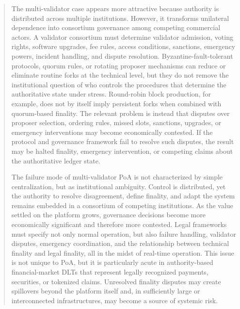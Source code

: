 \documentclass[
reprint,
showkeys,
superscriptaddress,
aps,
pra,
longbibliography,
nofootinbib
]{revtex4-2}
\begin{document}
\begin{abstract}
		The multi-validator case appears more attractive because authority is distributed across multiple institutions. 
		However, it transforms unilateral dependence into consortium governance among competing commercial actors. 
		A validator consortium must determine validator admission, voting rights, software upgrades, fee rules, access conditions, sanctions, emergency powers, incident handling, and dispute resolution. 
		Byzantine-fault-tolerant protocols, quorum rules, or rotating proposer mechanisms can reduce or eliminate routine forks at the technical level, but they do not remove the institutional question of who controls the procedures that determine the authoritative state under stress. 
		Round-robin block production, for example, does not by itself imply persistent forks when combined with quorum-based finality. 
		The relevant problem is instead that disputes over proposer selection, ordering rules, missed slots, sanctions, upgrades, or emergency interventions may become economically contested. 
		If the protocol and governance framework fail to resolve such disputes, the result may be halted finality, emergency intervention, or competing claims about the authoritative ledger state.
		
		The failure mode of multi-validator PoA is not characterized by simple centralization, but as institutional ambiguity. 
		Control is distributed, yet the authority to resolve disagreement, define finality, and adapt the system remains embedded in a consortium of competing institutions.
		As the value settled on the platform grows, governance decisions become more economically significant and therefore more contested. 
		Legal frameworks must specify not only normal operation, but also failure handling, validator disputes, emergency coordination, and the relationship between technical finality and legal finality, all in the midst of real-time operation.
		This issue is not unique to PoA, but it is particularly acute in authority-based financial-market DLTs that represent legally recognized payments, securities, or tokenized claims. 
		Unresolved finality disputes may create spillovers beyond the platform itself and, in sufficiently large or interconnected infrastructures, may become a source of systemic risk.
		

\end{abstract}
\end{document}
